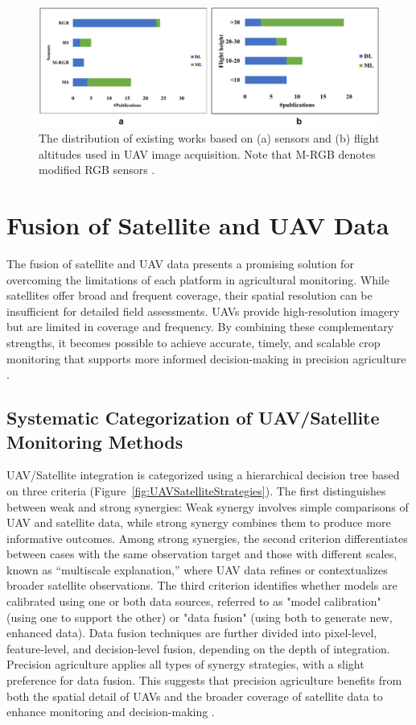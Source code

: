 \begin{figure}[H]
    \centering
    \includegraphics[width=0.8
    \textwidth]{chapters/chapter3/images/Figure10.png}
    \caption{The distribution of existing works based on (a) sensors and (b) flight altitudes used in UAV image acquisition. Note that M-RGB denotes modified RGB sensors \parencite{shahi2023recent}.}
    \label{fig:existingWorks}
\end{figure}


\section{Fusion of Satellite and UAV Data}

The fusion of satellite and UAV data presents a promising solution for overcoming the limitations of each platform in agricultural monitoring. While satellites offer broad and frequent coverage, their spatial resolution can be insufficient for detailed field assessments. UAVs provide high-resolution imagery but are limited in coverage and frequency. By combining these complementary strengths, it becomes possible to achieve accurate, timely, and scalable crop monitoring that supports more informed decision-making in precision agriculture \parencite{Maimaitijiang2020,Li2022}.

\subsection{Systematic Categorization of UAV/Satellite Monitoring Methods}
UAV/Satellite integration is categorized using a hierarchical decision tree based on three criteria (Figure~\ref{fig:UAVSatelliteStrategies}). The first distinguishes between weak and strong synergies: Weak synergy involves simple comparisons of UAV and satellite data, while strong synergy combines them to produce more informative outcomes. Among strong synergies, the second criterion differentiates between cases with the same observation target and those with different scales, known as “multiscale explanation,” where UAV data refines or contextualizes broader satellite observations. The third criterion identifies whether models are calibrated using one or both data sources, referred to as "model calibration" (using one to support the other) or "data fusion" (using both to generate new, enhanced data). Data fusion techniques are further divided into pixel-level, feature-level, and decision-level fusion, depending on the depth of integration. Precision agriculture applies all types of synergy strategies, with a slight preference for data fusion. This suggests that precision agriculture benefits from both the spatial detail of UAVs and the broader coverage of satellite data to enhance monitoring and decision-making \parencite{AlvarezVanhard2021}.

